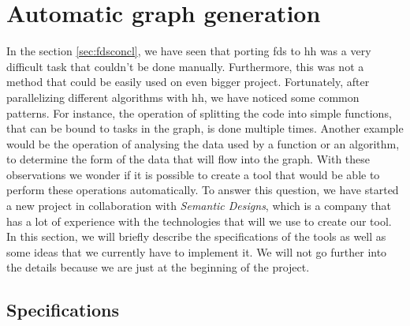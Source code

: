 
\section{Automatic graph generation}

In the section \ref{sec:fdsconcl}, we have seen that porting \gls{fds} to
\gls{hh} was a very difficult task that couldn't be done manually. Furthermore,
this was not a method that could be easily used on even bigger project.
Fortunately, after parallelizing different algorithms with \gls{hh}, we have
noticed some common patterns. For instance, the operation of splitting the code
into simple functions, that can be bound to tasks in the graph, is done multiple
times. Another example would be the operation of analysing the data used by a
function or an algorithm, to determine the form of the data that will flow into
the graph. With these observations we wonder if it is possible to create a tool
that would be able to perform these operations automatically. To answer this
question, we have started a new project in collaboration with \textit{Semantic
Designs}, which is a company that has a lot of experience with the technologies
that will we use to create our tool. In this section, we will briefly describe
the specifications of the tools as well as some ideas that we currently have to
implement it. We will not go further into the details because we are just at the
beginning of the project.

\subsection{Specifications}

